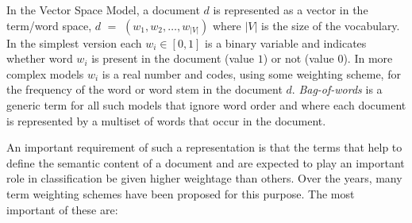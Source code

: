 In the Vector Space Model, a document $d$ is represented as a vector in the term/word space, $d$ $=$ $(w_{1}, w_{2}, \ldots, w_{|V|})$ where $|V|$ is the size of the vocabulary. In the simplest version each $w_{i} \in \left[0,1\right]$ is a binary variable and indicates whether word $w_i$ is present in the document (value $1$) or not (value $0$). In more complex models $w_i$ is a real number and codes, using some weighting scheme, for the frequency of the word or word stem in the document $d$. \emph{Bag-of-words} is a generic term for all such models that ignore word order and where each document is represented by a multiset of words that occur in the document. 

An important requirement of such a representation is that the terms that help to define the semantic content of a document and are expected to play an important role in classification be given higher weightage than others. Over the years, many term weighting schemes have been proposed for this purpose. The most important of these are:

